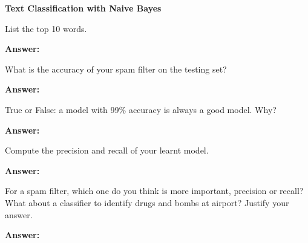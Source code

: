 \documentclass[12pt,twoside]{article}
\newcommand{\answer}{
 \par\medskip
 \textbf{Answer:}
}
\newcommand{\answerIIIIa}{ \answer

}
\newcommand{\answerIIIIb}{ \answer

}
\newcommand{\answerIIIIc}{ \answer

}
\newcommand{\answerIIIId}{ \answer

}
\newcommand{\answerIIIIe}{ \answer

}
\begin{document}
\begin{problems}
\newpage

\problem  \textbf{Text Classification with Naive Bayes}

\begin{problemparts}
\problempart  List the top 10 words.

\answerIIIIa

\problempart What is the accuracy of your spam filter on the testing set?
\answerIIIIb

\problempart True or False: a model with 99\% accuracy is always a good model. Why?
\answerIIIIc

\problempart Compute the precision and recall of your learnt model.
\answerIIIId 

\problempart For a spam filter, which one do you think is more important, precision or recall? What about a classifier to identify drugs and bombs at airport? Justify your answer.
\answerIIIIe 

\end{problemparts}

\end{problems}
\end{document}
